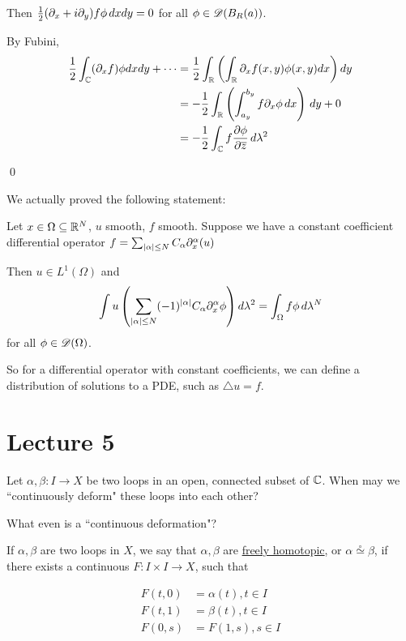 \documentclass[x11names,reqno,14pt]{extarticle}
\begin{document}
Then $\frac{1}{2}(\partial_x + i\partial_y)f\phi\,dxdy = 0$ for all $\phi \in \mathscr{D}(B_R(a))$. 

\proof

By Fubini, 
\begin{align*}
\frac{1}{2}\int_{\mathbb{C}}(\partial_x f)\phi dxdy + \cdots & = \frac{1}{2}\int_{\mathbb{R}}\left(\int_{\mathbb{R}}\partial_xf(x, y)\phi(x, y)dx\right)dy \\
			& = -\frac{1}{2}\int_{\mathbb{R}}\left(\int_{a_y}^{b_y}f\partial_x\phi\,dx\right)\,dy + 0 \\
			& = -\frac{1}{2}\int_{\mathbb{C}}f\frac{\partial\phi}{\partial\overline{z}}\,d\lambda^2 \\
\end{align*}

\qed

We actually proved the following statement: 

Let $x \in \Omega\subseteq \mathbb{R}^N$, $u$ smooth, $f$ smooth.
Suppose we have a constant coefficient differential operator $f = \sum_{|\alpha|\leq N}C_\alpha\partial_x^{\alpha}(u)$

Then $u \in L^1(\Omega)$ and 
\[
\int u \left(\sum_{|\alpha|\leq N}(-1)^{|\alpha|}C_\alpha \partial_x^\alpha \phi\right)d\lambda^2 = \int_{\Omega}f\phi\,d\lambda^N
\]
for all $\phi \in \mathscr{D}(\Omega)$. 

So for a differential operator with constant coefficients, we can define a distribution of solutions to a PDE, such as $\bigtriangleup u = f$. 

\section*{Lecture 5}

Let $\alpha, \beta:I\to X$ be two loops in an open, connected subset of $\mathbb{C}$. When may we ``continuously deform" these loops into each other? 

What even is a ``continuous deformation"?


If $\alpha, \beta$ are two loops in $X$, we say that $\alpha, \beta$ are \underline{freely homotopic}, or $\alpha\overset{\circ}{\simeq}\beta$, if there exists a continuous $F:I \times I \to X$, such that

\begin{align*}
F(t, 0) & = \alpha(t), t \in I \\
F(t, 1) & = \beta(t), t \in I\\
F(0, s) & = F(1, s), s \in I \\
\end{align*}
\end{document}
